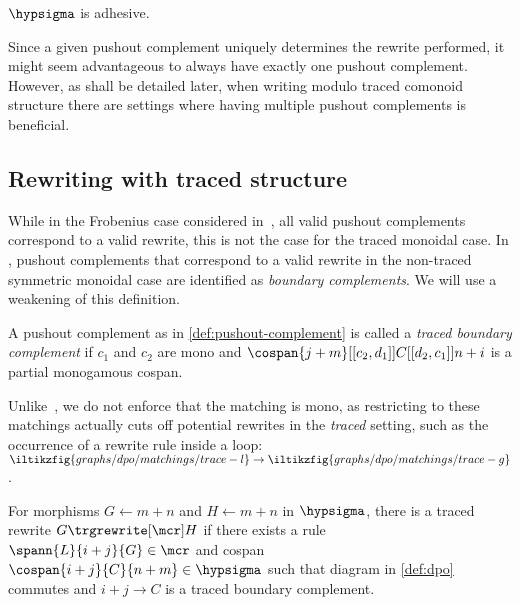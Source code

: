 \begin{proposition}
    \(\hypsigma\) is adhesive.
\end{proposition}

Since a given pushout complement uniquely determines the rewrite performed, it
might seem advantageous to always have exactly one pushout complement.
However, as shall be detailed later, when writing modulo traced comonoid
structure there are settings where having multiple pushout complements is
beneficial.

\subsection{Rewriting with traced structure}

While in the Frobenius case considered in~\cite{bonchi2022string}, all valid
pushout complements correspond to a valid rewrite, this is not the case for the
traced monoidal case.
In \cite{bonchi2022stringa}, pushout complements that correspond to a valid
rewrite in the non-traced symmetric monoidal case are identified as
\emph{boundary complements}.
We will use a weakening of this definition.

\begin{definition}
    \label{def:traced-boundary-complement}
    A pushout complement as in \cref{def:pushout-complement} is called a
    \emph{traced boundary complement} if \(c_1\) and \(c_2\) are mono and \(
        \cospan{j+m}[[c_2,d_1]]{C}[[d_2,c_1]]{{n+i}}
    \) is a partial monogamous cospan.
\end{definition}

Unlike~\cite{bonchi2022stringa}, we do not enforce that the matching is mono,
as restricting to these matchings actually cuts off potential rewrites in the
\emph{traced} setting, such as the occurrence of a rewrite rule inside a loop: \(
    \iltikzfig{graphs/dpo/matchings/trace-l}
    \to
    \iltikzfig{graphs/dpo/matchings/trace-g}
\).

\begin{definition}
    For morphisms \(G \leftarrow m+n\) and \(H \leftarrow m+n\) in
    \(\hypsigma\), there is a traced rewrite \(G \trgrewrite[\mcr] H\) if there
    exists a rule \(
        \spann{L}{i+j}{G} \in \mcr
    \) and cospan \(
        \cospan{i+j}{C}{n+m} \in \hypsigma
    \) such that diagram in \cref{def:dpo} commutes and \(i+j \to C\) is a
    traced boundary complement.
\end{definition}

